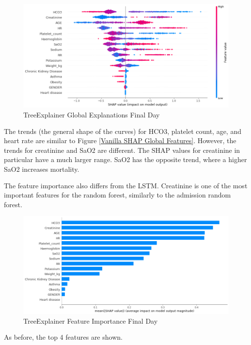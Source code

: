 \documentclass[12pt]{article}
\begin{document}
\begin{figure}[H]
\centering\caption{TreeExplainer Global Explanations Final Day}
\includegraphics[scale=0.4]{TreeExplainer Final1 Global/TreeExplainer Final1 Global.png}
\end{figure}
The trends (the general shape of the curves) for HCO3, platelet count, age, and heart rate are similar to Figure \ref{Vanilla SHAP Global Features}. However, the trends for creatinine and SaO2 are different. The SHAP values for creatinine in particular have a much larger range. SaO2 has the opposite trend, where a higher SaO2 increases mortality.

The feature importance also differs from the LSTM. Creatinine is one of the most important features for the random forest, similarly to the admission random forest.

\begin{figure}[H]
\centering\caption{TreeExplainer Feature Importance Final Day}
\includegraphics[scale=0.4]{TreeExplainer Final1 Global/TreeExplainer Final1 Feature Importance.png}
\end{figure}
As before, the top 4 features are shown.
\end{document}
